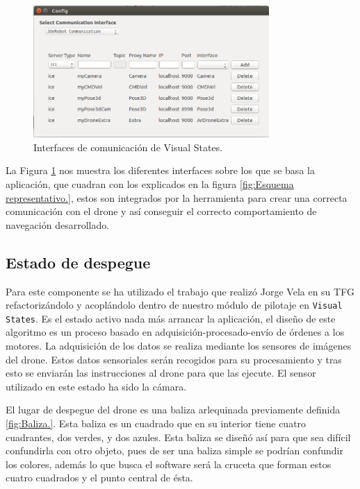 \begin{figure}[H]
	\begin{center}
		\includegraphics[width=0.8\textwidth]{imag/IMG70.png}
				\caption{Interfaces de comunicación de Visual States.}
		\label{fig:Esquema interfaces VisualStates.}	
	\end{center}
\end{figure}

La Figura \ref{fig:Esquema interfaces VisualStates.} nos muestra los diferentes interfaces sobre los que se basa la aplicación, que cuadran con los explicados en la figura \ref{fig:Esquema representativo.}, estos son integrados por la herramienta para crear una correcta comunicación con el drone y así conseguir el correcto comportamiento de navegación desarrollado. 

\subsection{Estado de despegue}
\hspace{1cm} Para este componente se ha utilizado el trabajo que realizó Jorge Vela en su TFG \cite{JorgeVela} refactorizándolo y acoplándolo dentro de nuestro módulo de pilotaje en \texttt{Visual States}. Es el estado activo nada más arrancar la aplicación, el diseño de este algoritmo es un proceso basado en adquisición-procesado-envío de órdenes a los motores. La adquisición de los datos se realiza mediante los sensores de imágenes del drone. Estos datos sensoriales serán recogidos para su procesamiento y tras esto se enviarán las instrucciones al drone para que las ejecute. El sensor utilizado en este estado ha sido la cámara.

\hspace{1cm} El lugar de despegue del drone es una baliza arlequinada previamente definida \ref{fig:Baliza.}. Esta baliza es un cuadrado que en su interior tiene cuatro cuadrantes, dos verdes, y dos azules. Esta baliza se diseñó así para que sea difícil confundirla con otro objeto, pues de ser una baliza simple se podrían confundir los colores, además lo que busca el software será la cruceta que forman estos cuatro cuadrados y el punto central de ésta.

